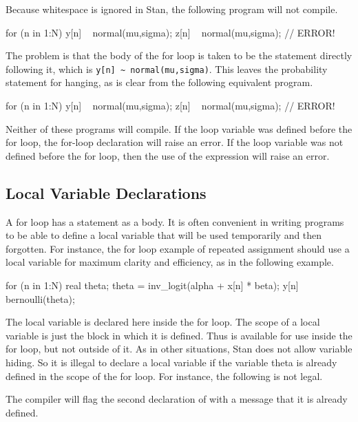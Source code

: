 Because whitespace is ignored in Stan, the following program will
not compile.
%
\begin{stancode}
for (n in 1:N)
  y[n] ~ normal(mu,sigma);
  z[n] ~ normal(mu,sigma); // ERROR!
\end{stancode}
%
The problem is that the body of the for loop is taken to be the
statement directly following it, which is
\Verb|y[n] ~ normal(mu,sigma)|.  This leaves the probability statement for
 hanging, as is clear from the following equivalent
program.
%
\begin{stancode}
for (n in 1:N) {
  y[n] ~ normal(mu,sigma);
}
z[n] ~ normal(mu,sigma); // ERROR!
\end{stancode}
%
Neither of these programs will compile. If the loop variable 
was defined before the for loop, the for-loop declaration will raise
an error.  If the loop variable  was not defined before the
for loop, then the use of the expression  will raise an
error.

\subsection{Local Variable Declarations}

A for loop has a statement as a body.  It is often convenient in
writing programs to be able to define a local variable that will be
used temporarily and then forgotten.  For instance, the for loop
example of repeated assignment should use a local variable for maximum
clarity and efficiency, as in the following example.
%
\begin{stancode}
for (n in 1:N) {
  real theta;
  theta = inv_logit(alpha + x[n] * beta);
  y[n] ~ bernoulli(theta);
}
\end{stancode}
%
The local variable  is declared here inside the for loop.
The scope of a local variable is just the block in which it is
defined.  Thus  is available for use inside the for loop,
but not outside of it.  As in other situations, Stan does not allow
variable hiding.  So it is illegal to declare a local variable
 if the variable theta is already defined in the scope of
the for loop.  For instance, the following is not legal.
%
\begin{stancode}
for (m in 1:M) {
  real theta;
  for (n in 1:N) {
    real theta; // ERROR!
    theta = inv_logit(alpha + x[m,n] * beta);
    y[m,n] ~ bernoulli(theta);
// ...
\end{stancode}
%
The compiler will flag the second declaration of  with a
message that it is already defined.

